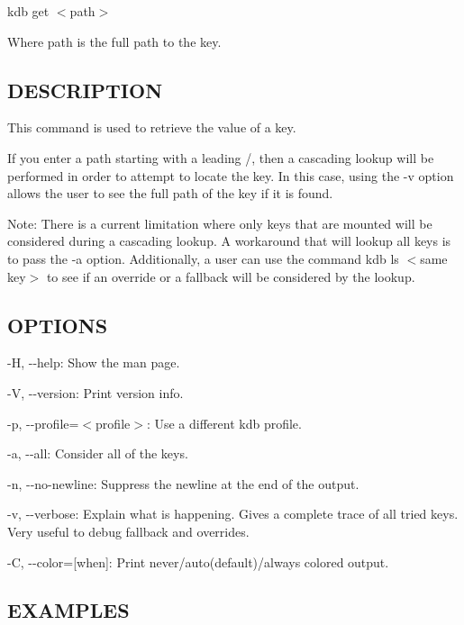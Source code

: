 {\ttfamily kdb get $<$path$>$}

Where {\ttfamily path} is the full path to the key.

\subsection*{D\+E\+S\+C\+R\+I\+P\+T\+I\+O\+N}

This command is used to retrieve the value of a key.

If you enter a {\ttfamily path} starting with a leading {\ttfamily /}, then a cascading lookup will be performed in order to attempt to locate the key. In this case, using the {\ttfamily -\/v} option allows the user to see the full {\ttfamily path} of the key if it is found.

Note\+: There is a current limitation where only keys that are mounted will be considered during a cascading lookup. A workaround that will lookup all keys is to pass the {\ttfamily -\/a} option. Additionally, a user can use the command {\ttfamily kdb ls $<$same key$>$} to see if an override or a fallback will be considered by the lookup.

\subsection*{O\+P\+T\+I\+O\+N\+S}


\begin{DoxyItemize}
\item {\ttfamily -\/\+H}, {\ttfamily -\/-\/help}\+: Show the man page.
\item {\ttfamily -\/\+V}, {\ttfamily -\/-\/version}\+: Print version info.
\item {\ttfamily -\/p}, {\ttfamily -\/-\/profile}=$<$profile$>$\+: Use a different kdb profile.
\item {\ttfamily -\/a}, {\ttfamily -\/-\/all}\+: Consider all of the keys.
\item {\ttfamily -\/n}, {\ttfamily -\/-\/no-\/newline}\+: Suppress the newline at the end of the output.
\item {\ttfamily -\/v}, {\ttfamily -\/-\/verbose}\+: Explain what is happening. Gives a complete trace of all tried keys. Very useful to debug fallback and overrides.
\item {\ttfamily -\/\+C}, {\ttfamily -\/-\/color}=\mbox{[}when\mbox{]}\+: Print never/auto(default)/always colored output.
\end{DoxyItemize}

\subsection*{E\+X\+A\+M\+P\+L\+E\+S}

